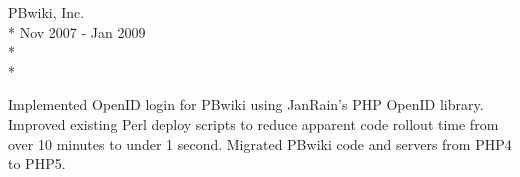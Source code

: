 \documentclass[10pt]{article}
\newcommand{\work}[5]{
#1\\*
#2\\*
\\*
\makebox[1in][l]{}
\begin{minipage}[t]{5.50in}\small{#5}\end{minipage}
\\
\\
}
\begin{document}
\work{PBwiki, Inc.}{Nov 2007 - Jan 2009}{San Mateo, California}{Systems Engineer}{
Implemented OpenID login for PBwiki using JanRain's PHP OpenID library.
Improved existing Perl deploy scripts to reduce apparent code rollout time from over 10 minutes to under 1 second.
Migrated PBwiki code and servers from PHP4 to PHP5.
}






\end{document}

